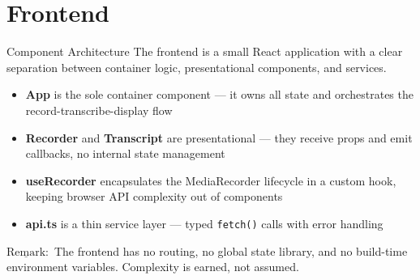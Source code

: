 \documentclass{beamer}
\newcommand{\rmk}{$\underline{\text{Remark}}:$ }
\begin{document}
\section{Frontend}

\begin{frame}{Component Architecture}
    The frontend is a small React application with a clear separation
    between container logic, presentational components, and services.

    \vspace{0.6em}
    \begin{itemize}
        \item \textbf{App} is the sole container component --- it owns all state
              and orchestrates the record-transcribe-display flow
        \item \textbf{Recorder} and \textbf{Transcript} are presentational ---
              they receive props and emit callbacks, no internal state management
        \item \textbf{useRecorder} encapsulates the MediaRecorder lifecycle
              in a custom hook, keeping browser API complexity out of components
        \item \textbf{api.ts} is a thin service layer --- typed \texttt{fetch()}
              calls with error handling
    \end{itemize}

    \vspace{0.4em}
    \rmk The frontend has no routing, no global state library, and no
    build-time environment variables. Complexity is earned, not assumed.
\end{frame}
\end{document}
